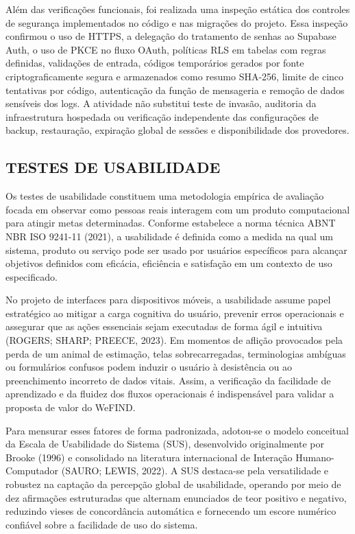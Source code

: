 Além das verificações funcionais, foi realizada uma inspeção estática dos controles de segurança implementados no código e nas migrações do projeto. Essa inspeção confirmou o uso de HTTPS, a delegação do tratamento de senhas ao Supabase Auth, o uso de PKCE no fluxo OAuth, políticas RLS em tabelas com regras definidas, validações de entrada, códigos temporários gerados por fonte criptograficamente segura e armazenados como resumo SHA-256, limite de cinco tentativas por código, autenticação da função de mensageria e remoção de dados sensíveis dos logs. A atividade não substitui teste de invasão, auditoria da infraestrutura hospedada ou verificação independente das configurações de backup, restauração, expiração global de sessões e disponibilidade dos provedores.

\subsection{TESTES DE USABILIDADE}

Os testes de usabilidade constituem uma metodologia empírica de avaliação focada em observar como pessoas reais interagem com um produto computacional para atingir metas determinadas. Conforme estabelece a norma técnica ABNT NBR ISO 9241-11 (2021), a usabilidade é definida como a medida na qual um sistema, produto ou serviço pode ser usado por usuários específicos para alcançar objetivos definidos com eficácia, eficiência e satisfação em um contexto de uso especificado.

No projeto de interfaces para dispositivos móveis, a usabilidade assume papel estratégico ao mitigar a carga cognitiva do usuário, prevenir erros operacionais e assegurar que as ações essenciais sejam executadas de forma ágil e intuitiva (ROGERS; SHARP; PREECE, 2023). Em momentos de aflição provocados pela perda de um animal de estimação, telas sobrecarregadas, terminologias ambíguas ou formulários confusos podem induzir o usuário à desistência ou ao preenchimento incorreto de dados vitais. Assim, a verificação da facilidade de aprendizado e da fluidez dos fluxos operacionais é indispensável para validar a proposta de valor do WeFIND.

Para mensurar esses fatores de forma padronizada, adotou-se o modelo conceitual da Escala de Usabilidade do Sistema (SUS), desenvolvido originalmente por Brooke (1996) e consolidado na literatura internacional de Interação Humano-Computador (SAURO; LEWIS, 2022). A SUS destaca-se pela versatilidade e robustez na captação da percepção global de usabilidade, operando por meio de dez afirmações estruturadas que alternam enunciados de teor positivo e negativo, reduzindo vieses de concordância automática e fornecendo um escore numérico confiável sobre a facilidade de uso do sistema.

